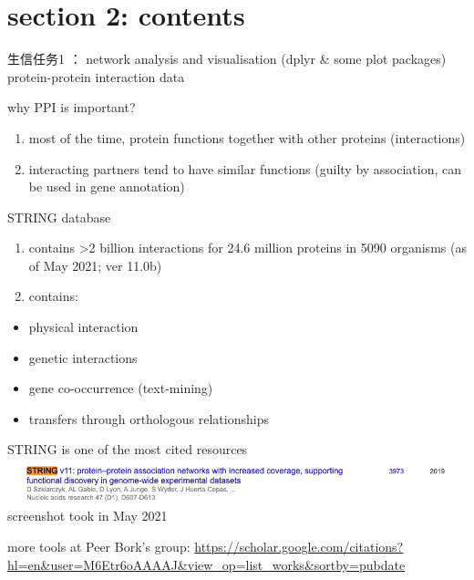 \documentclass[ignorenonframetext,]{beamer}
\providecommand{\tightlist}{%
  \setlength{\itemsep}{0pt}\setlength{\parskip}{0pt}}
\begin{document}
\hypertarget{section-2-contents}{%
\section{section 2: contents}\label{section-2-contents}}

\begin{frame}{生信任务1 ： network analysis and visualisation (dplyr \&
some plot packages)}
\protect\hypertarget{ux751fux4fe1ux4efbux52a11-network-analysis-and-visualisation-dplyr-some-plot-packages}{}
protein-protein interaction data

\begin{block}{why PPI is important?}
\protect\hypertarget{why-ppi-is-important}{}
\begin{enumerate}
\tightlist
\item
  most of the time, protein functions together with other proteins
  (interactions)
\item
  interacting partners tend to have similar functions (guilty by
  association, can be used in gene annotation)
\end{enumerate}
\end{block}
\end{frame}

\begin{frame}{STRING database}
\protect\hypertarget{string-database}{}
\begin{enumerate}
\tightlist
\item
  contains \textgreater2 billion interactions for 24.6 million proteins
  in 5090 organisms (as of May 2021; ver 11.0b)
\item
  contains:
\end{enumerate}

\begin{itemize}
\tightlist
\item
  physical interaction
\item
  genetic interactions
\item
  gene co-occurrence (text-mining)
\item
  transfers through orthologous relationships
\end{itemize}
\end{frame}

\begin{frame}{STRING is one of the most cited resources}
\protect\hypertarget{string-is-one-of-the-most-cited-resources}{}
\includegraphics[width=\textwidth,height=0.7\textheight]{images/talk06/STRING_google_scholar_citation_2021.png}
screenshot took in May 2021

more tools at Peer Bork's group:
\url{https://scholar.google.com/citations?hl=en\&user=M6Etr6oAAAAJ\&view_op=list_works\&sortby=pubdate}
\end{frame}
\end{document}
